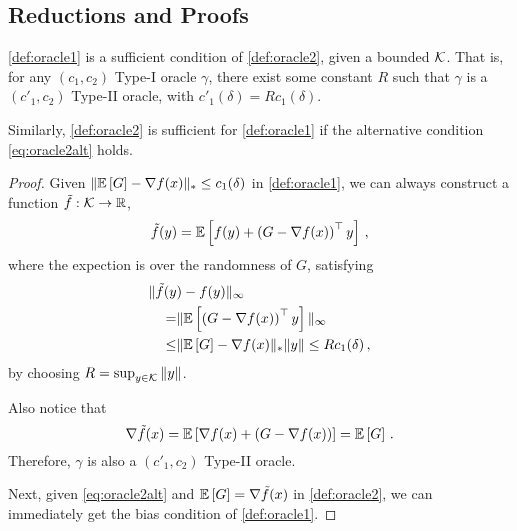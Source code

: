 \subsection{Reductions and Proofs}
\label{sec:orrel}

\begin{theorem}
\cref{def:oracle1} is a sufficient condition of \cref{def:oracle2}, given a bounded $\mathcal{K}$. That is, for any $(c_1,c_2)$ Type-I oracle $\gamma$, there exist some constant $R$ such that  $\gamma$ is a $(c'_1,c_2)$ Type-II oracle, with $c'_1(\delta)=Rc_1(\delta)$.

Similarly, \cref{def:oracle2} is sufficient for \cref{def:oracle1} if the alternative condition \eqref{eq:oracle2alt} holds.
\end{theorem}
\begin{proof}
Given $\| \mathbb{E}\left[G\right]  - \nabla f(x)  \|_* \le c_1(\delta) $ in \cref{def:oracle1}, we can always construct a function $\tilde{f}:\mathcal{K} \to \mathbb{R}$, 
\[
\tilde{f}(y) =\mathbb{E}\left[ f(y)+ \left( G-\nabla f(x) \right)^\top y\right] \,, 
\]
where the expection is over the randomness of $G$, satisfying
\begin{align*}
\MoveEqLeft
\norm{\tilde{f}(y)-f(y)}_{\infty} \\
= &
 \norm{ \EE{\left( G-\nabla f(x) \right)^\top y}}_{\infty}\\
 \le &\norm{\EE{G}-\nabla f(x)}_* \norm{y}
 \le  Rc_1(\delta)\,,
\end{align*} 
by choosing $R = \sup_{y \in \mathcal{K}}\|y\|$.

Also notice that
\[
 \nabla \tilde{f}(x) = \mathbb{E}\left[\nabla f(x)+ \left( G-\nabla f(x)\right)\right]
 =\mathbb{E}\left[G\right]\,.
\]
Therefore, $\gamma$ is also a $(c'_1,c_2)$ Type-II oracle.

Next, given \eqref{eq:oracle2alt} and $\mathbb{E}\left[G\right]=\nabla \tilde{f}(x)$ in \cref{def:oracle2}, we can immediately get the bias condition of \cref{def:oracle1}. 
\end{proof}

